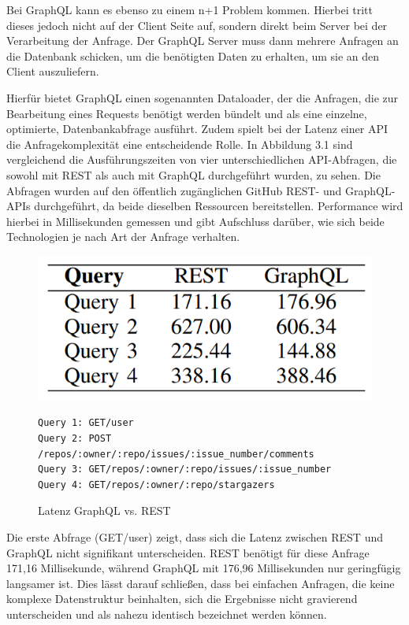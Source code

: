 \noindent
Bei GraphQL kann es ebenso zu einem n+1 Problem kommen. Hierbei tritt dieses jedoch nicht auf der Client Seite auf, sondern direkt beim Server bei der Verarbeitung der Anfrage. Der GraphQL Server muss dann mehrere Anfragen an die Datenbank schicken, um die benötigten Daten zu erhalten, um sie an den Client auszuliefern.
\citep{graphqlsemantics}

\noindent
Hierfür bietet GraphQL einen sogenannten Dataloader, der die Anfragen, die zur Bearbeitung eines Requests benötigt werden bündelt und als eine einzelne, optimierte, Datenbankabfrage ausführt. \citep{nordstrom2022graphql}
\newline
\noindent
Zudem spielt bei der Latenz einer API die Anfragekomplexität eine entscheidende Rolle. In Abbildung 3.1 sind vergleichend die Ausführungszeiten von vier unterschiedlichen API-Abfragen, die sowohl mit REST als auch mit GraphQL durchgeführt wurden, zu sehen. Die Abfragen wurden auf den öffentlich zugänglichen GitHub REST- und GraphQL-APIs durchgeführt, da beide dieselben Ressourcen bereitstellen. Performance wird hierbei in Millisekunden gemessen und gibt Aufschluss darüber, wie sich beide Technologien je nach Art der Anfrage verhalten. 
\begin{figure}[H]
	\centering
	\includegraphics[scale=.5]{Illustrations/cangraphqlreplacerest.png}
\begin{BVerbatim}
Query 1: GET/user
Query 2: POST /repos/:owner/:repo/issues/:issue_number/comments
Query 3: GET/repos/:owner/:repo/issues/:issue_number
Query 4: GET/repos/:owner/:repo/stargazers
\end{BVerbatim}
	\caption{Latenz GraphQL vs. REST \citep{graphqlreplacerest}}
\end{figure}
\noindent
Die erste Abfrage (GET/user) zeigt, dass sich die Latenz zwischen REST und GraphQL nicht signifikant unterscheiden. REST benötigt für diese Anfrage 171,16 Millisekunde, während GraphQL mit 176,96 Millisekunden nur geringfügig langsamer ist. Dies lässt darauf schließen, dass bei einfachen Anfragen, die keine komplexe Datenstruktur beinhalten, sich die Ergebnisse nicht gravierend unterscheiden und als nahezu identisch bezeichnet werden können.
